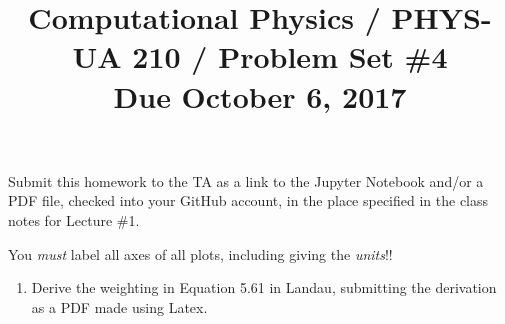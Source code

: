 \documentclass[11pt, preprint]{aastex}
\begin{document}
\title{\bf Computational Physics / PHYS-UA 210 / Problem Set \#4
\\ Due October 6, 2017 }

Submit this homework to the TA as a link to the Jupyter Notebook
and/or a PDF file, checked into your GitHub account, in the place
specified in the class notes for Lecture \#1.

You {\it must} label all axes of all plots, including giving the {\it
  units}!!

\begin{enumerate}

  \item Derive the weighting in Equation 5.61 in Landau, submitting
    the derivation as a PDF made using Latex.

\end{enumerate}
\end{document}
